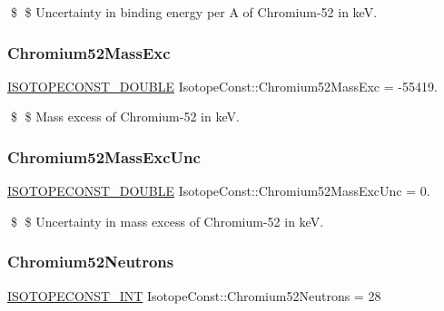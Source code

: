 \$ \$ Uncertainty in binding energy per A of Chromium-\/52 in keV. \mbox{\label{group___isotope_const-_chromium-_cr52_ga9cc565d21300d0b987e87ff3fc71f235}} 
\subsubsection{\texorpdfstring{Chromium52\+Mass\+Exc}{Chromium52MassExc}}
{\footnotesize\ttfamily \mbox{\hyperlink{group___isotope_const-_macros_ga8f45a7272ce02c0b4c65c44636ed719a}{I\+S\+O\+T\+O\+P\+E\+C\+O\+N\+S\+T\+\_\+\+D\+O\+U\+B\+LE}} Isotope\+Const\+::\+Chromium52\+Mass\+Exc = -\/55419.}

\$ \$ Mass excess of Chromium-\/52 in keV. \mbox{\label{group___isotope_const-_chromium-_cr52_ga61ef3726c649eb5f5a54c8acfb066157}} 
\subsubsection{\texorpdfstring{Chromium52\+Mass\+Exc\+Unc}{Chromium52MassExcUnc}}
{\footnotesize\ttfamily \mbox{\hyperlink{group___isotope_const-_macros_ga8f45a7272ce02c0b4c65c44636ed719a}{I\+S\+O\+T\+O\+P\+E\+C\+O\+N\+S\+T\+\_\+\+D\+O\+U\+B\+LE}} Isotope\+Const\+::\+Chromium52\+Mass\+Exc\+Unc = 0.}

\$ \$ Uncertainty in mass excess of Chromium-\/52 in keV. \mbox{\label{group___isotope_const-_chromium-_cr52_gaf33764b08e0cec3f599aac2df3094f99}} 
\subsubsection{\texorpdfstring{Chromium52\+Neutrons}{Chromium52Neutrons}}
{\footnotesize\ttfamily \mbox{\hyperlink{group___isotope_const-_macros_ga5f18360b3e99483a35c32d789e62621c}{I\+S\+O\+T\+O\+P\+E\+C\+O\+N\+S\+T\+\_\+\+I\+NT}} Isotope\+Const\+::\+Chromium52\+Neutrons = 28}

